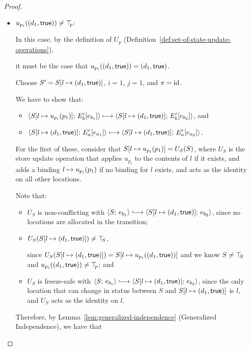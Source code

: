 \begin{proof}
\begin{enumerate}
\begin{enumerate}
\begin{itemize}
\begin{itemize}
        \item $u_{p_i}((d_1, \textsf{true})) \neq \top\hspace{-0.85mm}_{p}$:


          In this case, by the definition of $U_p$
          (Definition~\ref{def:set-of-state-update-operations}),
          
          it must be the case that $u_{p_i}((d_1, \textsf{true}))
          = (d_1, \textsf{true})$.

          Choose $S' = S[l \mapsto (d_1, \textsf{true})]$, $i = 1$, $j
          = 1$, and $\pi = \mathrm{id}$.

          We have to show that:
          \begin{itemize}
          \item
            $\langle S[l \mapsto u_{p_i}(p_1)];\, E'_b\hspace{-0.5mm}\left[e_{b_1}\right] \rangle
            \longmapsto
            \langle S[l \mapsto (d_1, \textsf{true})];\, E'_b\hspace{-0.5mm}\left[e_{b_2}\right] \rangle$,
            and
          \item
            $\langle S[l \mapsto (d_1, \textsf{true})];\, E'_a\hspace{-0.5mm}\left[e_{a_1}\right] \rangle
            \longmapsto
            \langle S[l \mapsto (d_1, \textsf{true})];\, E'_a\hspace{-0.5mm}\left[e_{a_2}\right] \rangle$.
          \end{itemize}

          For the first of these, consider that
          $S[l \mapsto u_{p_i}(p_1)] = U_S(S)$, where $U_S$ is
          the store update operation that applies $u_{p_i}$ to the
          contents of $l$ if it exists, and adds a binding
          $l \mapsto u_{p_i}(p_1)$ if no binding for
          $l$ exists, and acts as the identity on all other
          locations.

          Note that:
          \begin{itemize}
          \item $U_S$ is non-conflicting with $\config{S}{e_{b_1}}
            \parstepsto
            \config{\extS{S}{l}{d_1}{\frozentrue}}{e_{b_2}}$,
            since no locations are allocated in the
            transition;
          \item $U_S(S[l \mapsto (d_1, \textsf{true})]) \neq \top\hspace{-0.85mm}_{S}$,
            
            since $U_S(S[l \mapsto (d_1, \textsf{true})]) =
            S[l \mapsto u_{p_i}((d_1, \textsf{true}))]$ and
            we know $S \neq \top\hspace{-0.85mm}_{S}$ and
            $u_{p_i}((d_1, \textsf{true})) \neq \top\hspace{-0.85mm}_{p}$; and
          \item $U_S$ is freeze-safe with $\config{S}{e_{b_1}}
            \parstepsto
            \config{\extS{S}{l}{d_1}{\frozentrue}}{e_{b_2}}$, since
            the only location that can change in status between $S$
            and $S[l \mapsto (d_1, \textsf{true})]$ is $l$, and $U_S$
            acts as the identity on $l$.
          \end{itemize}
          Therefore, by Lemma~\ref{lem:generalized-independence}
          (Generalized Independence), we have that


\end{itemize}
\end{itemize}
\end{enumerate}
\end{enumerate}
\end{proof}
